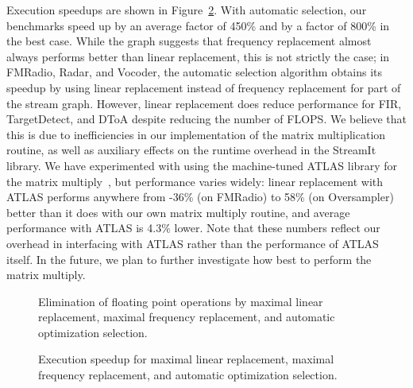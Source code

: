 \documentclass{sig-alternate}
\begin{document}
{Execution speedups are shown in Figure~\ref{fig:execution-speedup}.
With automatic selection, our benchmarks speed up by an average factor
of 450\% and by a factor of 800\% in the best case.  While the graph
suggests that frequency replacement almost always performs better than
linear replacement, this is not strictly the case; in FMRadio, Radar,
and Vocoder, the automatic selection algorithm obtains its speedup by
using linear replacement instead of frequency replacement for part of
the stream graph.  However, linear replacement does reduce performance
for FIR, TargetDetect, and DToA despite reducing the number of FLOPS.
We believe that this is due to inefficiencies in our implementation of
the matrix multiplication routine, as well as auxiliary effects on the
runtime overhead in the StreamIt library.  We have experimented with
using the machine-tuned ATLAS library for the matrix
multiply~\cite{whaley01automated}, but performance varies widely:
linear replacement with ATLAS performs anywhere from -36\% (on
FMRadio) to 58\% (on Oversampler) better than it does with our own
matrix multiply routine, and average performance with ATLAS is 4.3\%
lower.  Note that these numbers reflect our overhead in interfacing
with ATLAS rather than the performance of ATLAS itself.  In the
future, we plan to further investigate how best to perform the matrix
multiply.

\begin{figure}[t]
\vspace{-16pt}
\vspace{-16pt}
\caption{Elimination of floating point operations by maximal linear replacement, maximal frequency replacement, and automatic optimization selection.}
\label{fig:flops}
\vspace{-12pt}
\makeline
\vspace{-12pt}
\end{figure}

\begin{figure}[t]
\vspace{-16pt}
\caption{Execution speedup for maximal linear replacement, maximal frequency replacement, and automatic optimization selection.}
\label{fig:execution-speedup}
\vspace{-12pt}
\makeline
\vspace{-12pt}
\end{figure}

}
\end{document}
